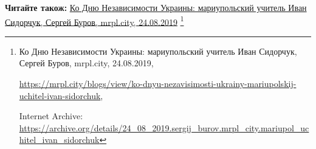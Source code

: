  
 
 
 
 

\def\pubIA{https://archive.org/details/24_08_2019.sergij_burov.mrpl_city.mariupol_uchitel_ivan_sidorchuk}
\def\pubTitle{Ко Дню Независимости Украины: мариупольский учитель Иван Сидорчук}
\def\pubDate{24.08.2019}
\def\pubOrigin{https://mrpl.city/blogs/view/ko-dnyu-nezavisimosti-ukrainy-mariupolskij-uchitel-ivan-sidorchuk}
\def\pubAuthor{Сергей Буров}

\textbf{Читайте також:} \href{\pubIA}{%
\pubTitle, \pubAuthor, mrpl.city, \pubDate}%
\footnote{\pubTitle, \pubAuthor, mrpl.city, \pubDate, \par\url{\pubOrigin}, \par Internet Archive: \url{\pubIA}}
